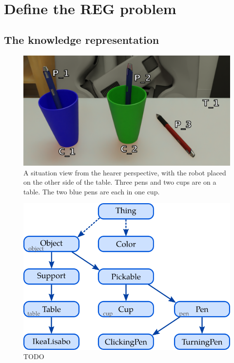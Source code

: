 \section{Define the REG problem}

\subsection{The knowledge representation}

\begin{figure}[h!]
\centering
\includegraphics[scale=0.2]{figures/chapter4/pens.png}
\caption{\label{fig:chap4_kb} A situation view from the hearer perspective, with the robot placed on the other side of the table. Three pens and two cups are on a table. The two blue pens are each in one cup. }
\end{figure}

\begin{figure}[h!]
\centering
\includegraphics[scale=0.4]{figures/chapter4/pens_Tbox.png}
\caption{\label{fig:chap4_kb_Tbox} TODO }
\end{figure}

